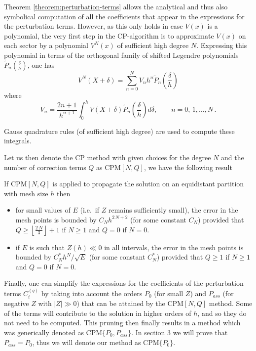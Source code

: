 Theorem \ref{theorem:perturbation-terms} allows the analytical and thus also symbolical computation of all the coefficients that appear in the expressions for the perturbation terms.
However, as this only holds in case $V(x)$ is a polynomial, the very first step in the CP-algorithm is to approximate $V(x)$ on each sector by a polynomial $V^{N}(x)$ of sufficient high degree $N$.
Expressing this polynomial in terms of the orthogonal family of shifted Legendre polynomials \(\widetilde{P}_n(\frac{\delta}{h})\),
one has
\[ V^{N}(X+\delta) = \sum_{n=0}^N V_n h^n \widetilde{P}_n(\frac{\delta}{h})  \]
where
\begin{equation} V_n= \frac{2 n +1}{h^{n+1}} \int_0^h V(X+\delta) \widetilde{P}_n(\frac{\delta}{h}) d \delta, \qquad n=0,\,1,\ldots,N \,. \label{eq:Vn}\end{equation}

Gauss quadrature rules (of sufficient high degree) are used to compute these integrals.

Let us then denote the CP method with given choices for the degree $N$ and the number of correction terms $Q$ as CPM$[N,Q]$, we have the  following result \cite{ixaru_cp_1998}

\begin{theorem}\label{theorem:error-estimate}
    If $\text{CPM}[N,Q]$ is applied to propagate the solution on an equidistant partition with mesh size $h$ then
    \begin{itemize}
        \item for small values of $E$ (i.e.\ if $Z$ remains sufficiently small), the error in the mesh points is bounded by $C_N h^{2\,N+2}$ (for some constant $C_N$) provided that $Q \geq \left\lfloor \frac{2\,N}{3} \right\rfloor +1$ if $N \geq 1$ and $Q=0$ if $N=0$.
        \item if $E$ is such that $Z(h)\ll 0$ in all intervals, the error in the mesh points is bounded by $C^*_N h^{N}/ \sqrt{E}$  (for some constant $C^*_N$) provided that $Q \geq 1$  if $N \geq 1$ and $Q=0$ if $N=0$.
    \end{itemize}
\end{theorem}

Finally, one can simplify the expressions for the coefficients of the perturbation terms \(C^{(q)}_i\) by taking into account the orders $P_0$ (for small $Z$) and $P_{ass}$ (for negative $Z$ with $|Z| \gg 0$) that can be attained by the CPM$[N,Q]$ method. Some of the terms will contribute to the solution in higher orders of $h$, and so they do not need to be computed. This pruning then finally results in a method which was generically denoted as CPM$\{P_0, P_{ass}\}$. In section 3 we will prove that $P_{ass} = P_0$, thus we will denote our method as CPM$\{P_0\}$.

